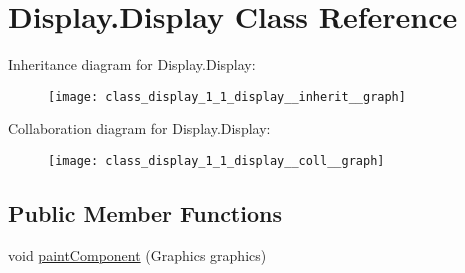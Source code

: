 \hypertarget{class_display_1_1_display}{}\section{Display.\+Display Class Reference}
\label{class_display_1_1_display}


Inheritance diagram for Display.\+Display\+:
\nopagebreak
\begin{figure}[H]
\begin{center}
\leavevmode
\texttt{[image: class\_display\_1\_1\_display\_\_inherit\_\_graph]}
\end{center}
\end{figure}


Collaboration diagram for Display.\+Display\+:
\nopagebreak
\begin{figure}[H]
\begin{center}
\leavevmode
\texttt{[image: class\_display\_1\_1\_display\_\_coll\_\_graph]}
\end{center}
\end{figure}
\subsection*{Public Member Functions}
\begin{DoxyCompactItemize}
\item 
void \hyperlink{class_display_1_1_display_af117c5499fbaada7683424523b9f333f}{paint\+Component} (Graphics graphics)
\end{DoxyCompactItemize}
